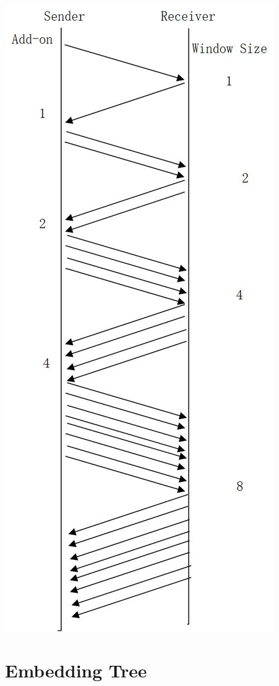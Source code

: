 \documentclass[12pt,a4paper]{article}
\begin{document}
\includegraphics{PIC/network.png}

\section{Embedding Tree}
\end{document}
